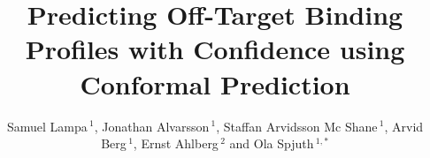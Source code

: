 \documentclass[utf8]{frontiersSCNS} %
\def\firstAuthorLast{Lampa {et~al.}} %
\def\Authors{Samuel Lampa\,$^{1}$, Jonathan Alvarsson\,$^{1}$, Staffan Arvidsson Mc Shane\,$^{1}$, Arvid Berg\,$^{1}$, Ernst Ahlberg\,$^{2}$  and Ola Spjuth\,$^{1,*}$}
\begin{document}
\onecolumn
{}

\title[Predicting Off-Target Binding Profiles with Confidence]{Predicting Off-Target Binding Profiles with Confidence using Conformal
Prediction}

\author[\firstAuthorLast ]{\Authors} %
\address{} %
\correspondance{} %

\extraAuth{}%


\maketitle
\end{document}
